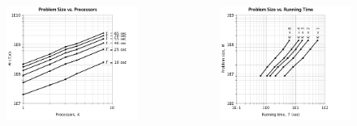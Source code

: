 \documentclass[handout]{beamer}
\begin{document}
\begin{frame}
\begin{columns}
\begin{minipage}[c][.6\textheight][c]{\linewidth}
	\begin{figure}
	\centering
	\includegraphics[scale = 0.25]{ge_size_3.png}
	\end{figure}
	\vspace{-2em}
	\begin{figure}
	\centering
	\includegraphics[scale = 0.25]{ge_size_4.png}
	\end{figure}
\end{minipage}
\end{columns}
\end{frame}
\end{document}
